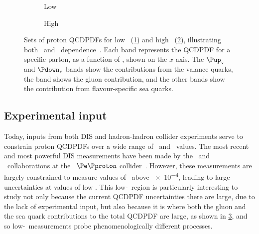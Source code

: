 
\begin{figure}
  \begin{subfigure}[b]{0.5\textwidth}
    \centering
    
    \caption{Low \pdfqsquared}
    \label{fig:prod:theory:pdf_sets:low_qsquared}
  \end{subfigure}
  \begin{subfigure}[b]{0.5\textwidth}
    \centering
    
    \caption{High \pdfqsquared}
    \label{fig:prod:theory:pdf_sets:high_qsquared}
  \end{subfigure}
  \caption{%
    Sets of proton \aclp{QCDPDF} for low \pdfqsquared\ 
    (\cref{fig:prod:theory:pdf_sets:low_qsquared}) and high \pdfqsquared\ 
    (\cref{fig:prod:theory:pdf_sets:high_qsquared}), illustrating both 
    \bjorkenx\ and \pdfqsquared\ dependence~\cite{PDG2014}.
    Each band represents the \ac{QCDPDF} for a specific parton, as a function 
    of \bjorkenx, shown on the $x$-axis.
    The $\Pup_{\text{v}}$ and $\Pdown_{\text{v}}$ bands show the contributions 
    from the valance quarks, the \Pgluon band shows the gluon contribution, and 
    the other bands show the contribution from flavour-specific sea quarks.
  }
  \label{fig:prod:theory:pdf_sets}
\end{figure}

\subsection{Experimental input}
\label{chap:prod:theory:pdfs:inputs}

Today, inputs from both \ac{DIS} and hadron-hadron collider experiments serve 
to constrain proton \acp{QCDPDF} over a wide range of \bjorkenx\ and 
\pdfqsquared\ values.
The most recent and most powerful \ac{DIS} measurements have been made by the 
\hone\ and \zeus\ collaborations at the \hera\ $\Pe\Pproton$ 
collider~\cite{Abramowicz:1900rp}.
However, these measurements are largely constrained to measure values of 
\bjorkenx\ above \num{e-4}, leading to large uncertainties at values of low 
\bjorkenx.
This low-\bjorkenx\ region is particularly interesting to study not only 
because the current \ac{QCDPDF} uncertainties there are large, due to the lack 
of experimental input, but also because it is where both the gluon and the sea 
quark contributions to the total \ac{QCDPDF} are large, as shown in 
\cref{fig:prod:theory:pdf_sets}, and so low-\bjorkenx\ measurements probe 
phenomenologically different processes.

